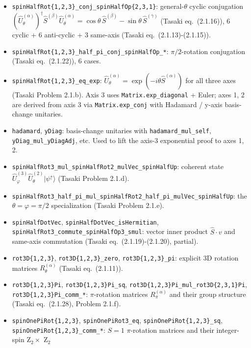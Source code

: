 \documentclass[a4paper,11pt]{article}
\begin{document}
\begin{itemize}
\item \texttt{spinHalfRot\{1,2,3\}\_conj\_spinHalfOp\{2,3,1\}}: general-$\theta$
  cyclic conjugation $(\hat U^{(\alpha)}_\theta)^\dagger \hat S^{(\beta)}
  \hat U^{(\alpha)}_\theta = \cos\theta\,\hat S^{(\beta)} - \sin\theta\,\hat S^{(\gamma)}$
  (Tasaki eq.~(2.1.16)), 6 cyclic + 6 anti-cyclic + 3 same-axis (Tasaki
  eq.~(2.1.13)-(2.1.15)).
\item \texttt{spinHalfRot\{1,2,3\}\_half\_pi\_conj\_spinHalfOp\_*}:
  $\pi/2$-rotation conjugation (Tasaki eq.~(2.1.22)), 6 cases.
\item \texttt{spinHalfRot\{1,2,3\}\_eq\_exp}: $\hat U^{(\alpha)}_\theta =
  \exp(-i\theta\hat S^{(\alpha)})$ for all three axes (Tasaki
  Problem 2.1.b). Axis 3 uses \texttt{Matrix.exp\_diagonal} +
  Euler; axes 1, 2 are derived from axis 3 via \texttt{Matrix.exp\_conj}
  with Hadamard / y-axis basis-change unitaries.
\item \texttt{hadamard}, \texttt{yDiag}: basis-change unitaries with
  \texttt{hadamard\_mul\_self}, \texttt{yDiag\_mul\_yDiagAdj}, etc.
  Used to lift the axis-3 exponential proof to axes 1, 2.
\item \texttt{spinHalfRot3\_mul\_spinHalfRot2\_mulVec\_spinHalfUp}:
  coherent state $\hat U^{(3)}_\varphi \hat U^{(2)}_\theta |\psi^\uparrow\rangle$
  (Tasaki Problem 2.1.d).
\item \texttt{spinHalfRot3\_half\_pi\_mul\_spinHalfRot2\_half\_pi\_mulVec\_spinHalfUp}:
  the $\theta=\varphi=\pi/2$ specialization (Tasaki Problem 2.1.e).
\item \texttt{spinHalfDotVec}, \texttt{spinHalfDotVec\_isHermitian},
  \texttt{spinHalfRot3\_commute\_spinHalfOp3\_smul}: vector inner
  product $\hat S \cdot v$ and same-axis commutation (Tasaki
  eq.~(2.1.19)-(2.1.20), partial).
\item \texttt{rot3D\{1,2,3\}}, \texttt{rot3D\{1,2,3\}\_zero},
  \texttt{rot3D\{1,2,3\}\_pi}: explicit 3D rotation matrices
  $R^{(\alpha)}_\theta$ (Tasaki eq.~(2.1.11)).
\item \texttt{rot3D\{1,2,3\}Pi}, \texttt{rot3D\{1,2,3\}Pi\_sq},
  \texttt{rot3D\{1,2,3\}Pi\_mul\_rot3D\{2,3,1\}Pi},
  \texttt{rot3D\{1,2,3\}Pi\_comm\_*}: $\pi$-rotation matrices
  $R^{(\alpha)}_\pi$ and their group structure (Tasaki eq.~(2.1.28),
  Problem 2.1.f).
\item \texttt{spinOnePiRot\{1,2,3\}}, \texttt{spinOnePiRot3\_eq},
  \texttt{spinOnePiRot\{1,2,3\}\_sq}, \texttt{spinOnePiRot\{1,2,3\}\_comm\_*}:
  $S = 1$ $\pi$-rotation matrices and their integer-spin Z$_2 \times$ Z$_2$

\end{itemize}
\end{document}
